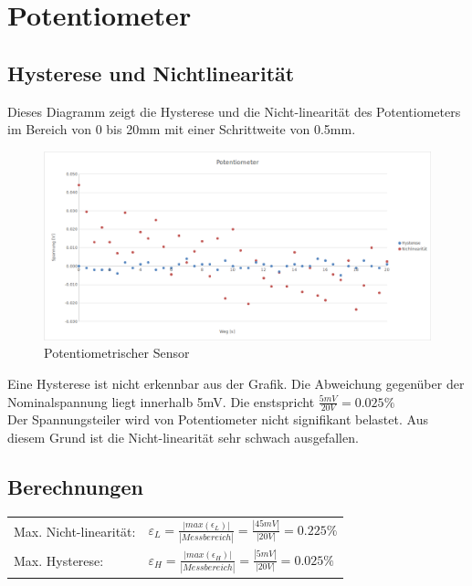 \section{Potentiometer}

\subsection{Hysterese und Nichtlinearität}

Dieses Diagramm zeigt die Hysterese und die Nicht-linearität des Potentiometers im Bereich von 0 bis 20mm mit einer Schrittweite von 0.5mm.\\

\begin{figure}[H]
    \centering
    \includegraphics[scale=0.5]{pic/poti1.png}
    \caption{Potentiometrischer Sensor}
    \label{fig:poti}
\end{figure}

Eine Hysterese ist nicht erkennbar aus der Grafik. Die Abweichung gegenüber der Nominalspannung liegt innerhalb 5mV. Die enstspricht $\frac{5mV}{20 V} = 0.025\%$\\

Der Spannungsteiler wird von Potentiometer nicht signifikant belastet. Aus diesem Grund ist die Nicht-linearität sehr schwach ausgefallen.

\subsection{Berechnungen}


\begin{tabular}{ l  l }
    Max. Nicht-linearität: & $\varepsilon_L = \frac{|max(\epsilon_L)|}{|Messbereich|}
                                            = \frac{|45mV|}{|20V|}  
                                            = 0.225\%                             $  \\
    Max. Hysterese:        & $\varepsilon_H = \frac{|max(\epsilon_H)|}{|Messbereich|}
                                            = \frac{|5mV|}{|20V|} 
                                            = 0.025\%                             $  \\
\end{tabular}


\clearpage